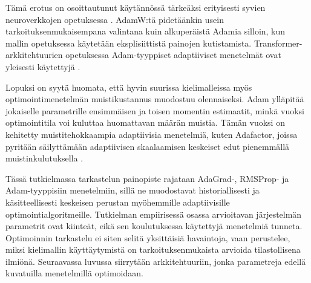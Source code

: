 Tämä erotus on osoittautunut käytännössä tärkeäksi erityisesti syvien
neuroverkkojen opetuksessa \cite{loshchilov2019decoupled}. AdamW:tä
pidetäänkin usein tarkoituksenmukaisempana valintana kuin alkuperäistä
Adamia silloin, kun mallin opetuksessa käytetään eksplisiittistä painojen
kutistamista. Transformer-arkkitehtuurien opetuksessa Adam-tyyppiset
adaptiiviset menetelmät ovat yleisesti käytettyjä
\cite{vaswani2017attention}.

Lopuksi on syytä huomata, että hyvin suurissa kielimalleissa myös
optimointimenetelmän muistikustannus muodostuu olennaiseksi. Adam
ylläpitää jokaiselle parametrille ensimmäisen ja toisen momentin
estimaatit, minkä vuoksi optimointitila voi kuluttaa huomattavan määrän
muistia. Tämän vuoksi on kehitetty muistitehokkaampia adaptiivisia
menetelmiä, kuten Adafactor, joissa pyritään säilyttämään adaptiivisen
skaalaamisen keskeiset edut pienemmällä muistinkulutuksella
\cite{shazeer2018adafactor}.

Tässä tutkielmassa tarkastelun painopiste rajataan AdaGrad-, RMSProp- ja
Adam-tyyppisiin menetelmiin, sillä ne muodostavat historiallisesti ja
käsitteellisesti keskeisen perustan myöhemmille adaptiivisille
optimointialgoritmeille. Tutkielman empiirisessä osassa arvioitavan
järjestelmän parametrit ovat kiinteät, eikä sen koulutuksessa käytettyjä
menetelmiä tunneta. Optimoinnin tarkastelu ei siten selitä yksittäisiä
havaintoja, vaan perustelee, miksi kielimallin käyttäytymistä on
tarkoituksenmukaista arvioida tilastollisena ilmiönä. Seuraavassa luvussa
siirrytään arkkitehtuuriin, jonka parametreja edellä kuvatuilla
menetelmillä optimoidaan.
